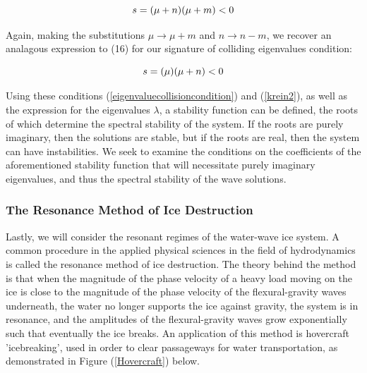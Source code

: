 \documentclass{article}
\begin{document}
 \begin{equation} \label{krein1}
  s = (\mu + n)(\mu + m) < 0
\\
\end{equation}

Again, making the substitutions \(\mu \rightarrow \mu + m \) and \(n \rightarrow n-m\), we recover an analagous expression to (16) for our signature of colliding eigenvalues condition:

 \begin{equation} \label{krein2}
  s = (\mu)(\mu + n) < 0
\\
\end{equation}


Using these conditions (\ref{eigenvaluecollisioncondition}) and (\ref{krein2}), as well as the expression for the eigenvalues \(\lambda\), a stability function can be defined, the roots of which determine the spectral stability of the system. If the roots are purely imaginary, then the solutions are stable, but if the roots are real, then the system can have instabilities.  We seek to examine the conditions on the coefficients of the aforementioned stability function that will necessitate purely imaginary eigenvalues, and thus the spectral stability of the wave solutions. \\

\subsubsection{The Resonance Method of Ice Destruction}

Lastly, we will consider the resonant regimes of the water-wave ice system. A common procedure in the applied physical sciences in the field of hydrodynamics is called the resonance method of ice destruction. The theory behind the method is that when the magnitude of the phase velocity of a heavy load moving on the ice is close to the magnitude of the phase velocity of the flexural-gravity waves underneath, the water no longer supports the ice against gravity, the system is in resonance, and the amplitudes of the flexural-gravity waves grow exponentially such that eventually the ice breaks. An application of this method is hovercraft 'icebreaking', used in order to clear passageways for water transportation, as demonstrated in Figure (\ref{Hovercraft}) below. 
\\
\end{document}
